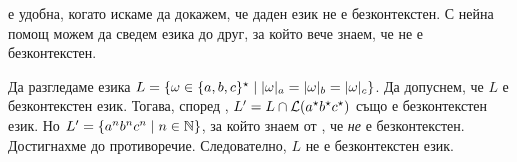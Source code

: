 \begin{extra}
   е удобна, когато искаме да докажем, че даден език не е безконтекстен.
С нейна помощ можем да сведем езика до друг, за който вече знаем, че не е безконтекстен.

  \begin{example}
    Да разгледаме езика $L = \{\omega \in \{a,b,c\}^\star \mid \vert{\omega}\vert_{a} = \vert{\omega}\vert_{b} = \vert{\omega}\vert_{c}\}$.
    Да допуснем, че $L$ е безконтекстен език. Тогава, според , $L^\prime = L \cap \mathcal{L}(a^\star b^\star c^\star)$ също е безконтекстен език.
    Но $L^\prime = \{a^nb^nc^n \mid n \in \mathbb{N}\}$, за който знаем от , че {\em не} е безконтекстен.
    Достигнахме до противоречие. Следователно, $L$ не е безконтекстен език.
  \end{example}
\end{extra}


